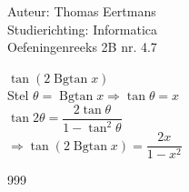 \documentclass[a4paper]{article}
\newcommand{\Bgtan}{\operatorname{Bgtan}}
\begin{document}
  
\noindent \large Auteur: Thomas Eertmans \\
\noindent \large Studierichting: Informatica\\
\noindent \large Oefeningenreeks 2B nr. 4.7\\

\medskip

\normalsize

$\tan(2\Bgtan x)$ \\

Stel $\theta = \Bgtan x \Rightarrow \tan \theta = x$ \\

$\tan 2\theta = \dfrac{2 \tan \theta}{1-\tan^2\theta}$ \\

$\Rightarrow \tan(2\Bgtan x) = \dfrac{2x}{1-x^2}$

\begin{thebibliography}{999}
\end{thebibliography}
\end{document}
